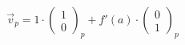 \documentclass[preview]{standalone}
\begin{document}
\begin{align*}
\vec{v}_p=1\cdot \begin{pmatrix}1\\ 0\end{pmatrix}_p+f'(a)\cdot \begin{pmatrix}0\\ 1\end{pmatrix}_p
\end{align*}
\end{document}
